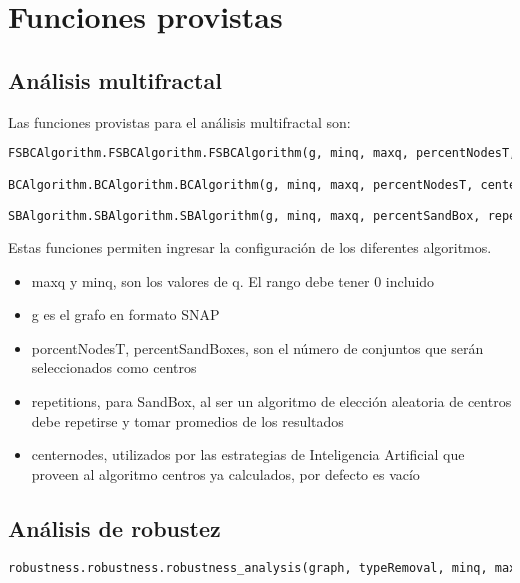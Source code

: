 \section{Funciones provistas}

\subsection{Análisis multifractal}

Las funciones provistas para el análisis multifractal son:

\begin{lstlisting}[language=python]
FSBCAlgorithm.FSBCAlgorithm.FSBCAlgorithm(g, minq, maxq, percentNodesT, centerNodes=array([], dtype=float64))

BCAlgorithm.BCAlgorithm.BCAlgorithm(g, minq, maxq, percentNodesT, centerNodes=array([], dtype=float64))

SBAlgorithm.SBAlgorithm.SBAlgorithm(g, minq, maxq, percentSandBox, repetitions, centerNodes=array([], dtype=float64))
\end{lstlisting}

Estas funciones permiten ingresar la configuración de los diferentes algoritmos.

\begin{itemize}
    \item maxq y minq, son los valores de q. El rango debe tener 0 incluido
    \item g es el grafo en formato SNAP
    \item porcentNodesT, percentSandBoxes, son el número de conjuntos que serán seleccionados como centros
    \item repetitions, para SandBox, al ser un algoritmo de elección aleatoria de centros debe repetirse y tomar promedios de los resultados
    \item centernodes, utilizados por las estrategias de Inteligencia Artificial que proveen al algoritmo centros ya calculados, por defecto es vacío
\end{itemize}

\subsection{Análisis de robustez}

\begin{lstlisting}[language=python]
robustness.robustness.robustness_analysis(graph, typeRemoval, minq, maxq, percentSandBox, repetitions, temperature=0, sizePopulation=0, iterationsGenetic=0, percentCrossOver=0, percentMutation=0, degreeOfBoring=0)
\end{lstlisting}

